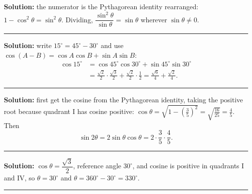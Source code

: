 \documentclass[12pt]{article}
\begin{document}



\textbf{Solution:} the numerator is the Pythagorean identity rearranged: $1 - \cos^2\theta = \sin^2\theta$. Dividing,
$\dfrac{\sin^2\theta}{\sin\theta} = \sin\theta$ wherever $\sin\theta \ne 0$. \ans{\sin\theta}

\vspace{0.12cm}\noindent\rule{\linewidth}{0.2pt}\vspace{0.12cm}


\textbf{Solution:} write $15^\circ = 45^\circ - 30^\circ$ and use $\cos(A - B) = \cos A\cos B + \sin A\sin B$:
\begin{align*}
  \cos 15^\circ &= \cos 45^\circ\cos 30^\circ + \sin 45^\circ\sin 30^\circ \\
  &= \frac{\sqrt{2}}{2}\cdot\frac{\sqrt{3}}{2} + \frac{\sqrt{2}}{2}\cdot\frac{1}{2}
   = \frac{\sqrt{6}}{4} + \frac{\sqrt{2}}{4}.
\end{align*}

\vspace{0.12cm}\noindent\rule{\linewidth}{0.2pt}\vspace{0.12cm}


\textbf{Solution:} first get the cosine from the Pythagorean identity, taking the positive root because quadrant I has cosine positive:
$\cos\theta = \sqrt{1 - \left(\tfrac{3}{5}\right)^2} = \sqrt{\tfrac{16}{25}} = \tfrac{4}{5}$. Then
\[ \sin 2\theta = 2\sin\theta\cos\theta = 2\cdot\frac{3}{5}\cdot\frac{4}{5}. \]

\vspace{0.12cm}\noindent\rule{\linewidth}{0.2pt}\vspace{0.12cm}


\textbf{Solution:} $\cos\theta = \dfrac{\sqrt{3}}{2}$, reference angle $30^\circ$, and cosine is positive in quadrants I and IV, so
$\theta = 30^\circ$ and $\theta = 360^\circ - 30^\circ = 330^\circ$. 

\vspace{0.12cm}\noindent\rule{\linewidth}{0.2pt}\vspace{0.12cm}
\end{document}
